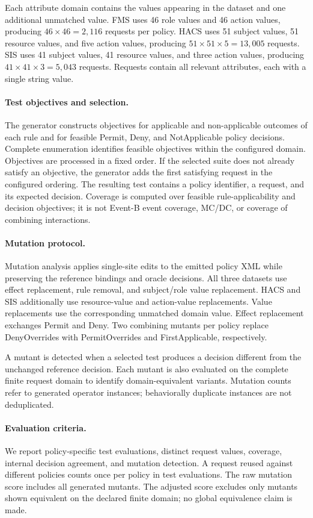 Each attribute domain contains the values appearing in the dataset
and one additional unmatched value. FMS uses 46 role values and 46
action values, producing $46\times46=2,116$ requests per policy.
HACS uses 51 subject values, 51 resource values, and five action values,
producing $51\times51\times5=13,005$ requests. SIS uses 41 subject
values, 41 resource values, and three action values, producing
$41\times41\times3=5,043$ requests. Requests contain all relevant
attributes, each with a single string value.

\paragraph{Test objectives and selection.}
The generator constructs objectives for applicable and non-applicable
outcomes of each rule and for feasible Permit, Deny, and NotApplicable
policy decisions. Complete enumeration identifies feasible objectives
within the configured domain. Objectives are processed in a fixed
order. If the selected suite does not already satisfy an objective,
the generator adds the first satisfying request in the configured
ordering. The resulting test contains a policy identifier, a request,
and its expected decision. Coverage is computed over feasible
rule-applicability and decision objectives; it is not Event-B event
coverage, MC/DC, or coverage of combining interactions.

\paragraph{Mutation protocol.}
Mutation analysis applies single-site edits to the emitted policy XML
while preserving the reference bindings and oracle decisions. All
three datasets use effect replacement, rule removal, and subject/role
value replacement. HACS and SIS additionally use resource-value and
action-value replacements. Value replacements use the corresponding
unmatched domain value. Effect replacement exchanges Permit and Deny.
Two combining mutants per policy replace DenyOverrides with
PermitOverrides and FirstApplicable, respectively.

A mutant is detected when a selected test produces a decision different
from the unchanged reference decision. Each mutant is also evaluated
on the complete finite request domain to identify domain-equivalent
variants. Mutation counts refer to generated operator instances;
behaviorally duplicate instances are not deduplicated.

\paragraph{Evaluation criteria.}
We report policy-specific test evaluations, distinct request values,
coverage, internal decision agreement, and mutation detection.
A request reused against different policies counts once per policy
in test evaluations. The raw mutation score includes all generated
mutants. The adjusted score excludes only mutants shown equivalent
on the declared finite domain; no global equivalence claim is made.

